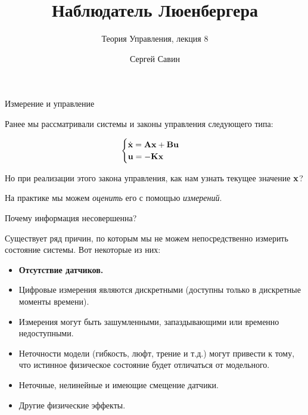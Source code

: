 \documentclass{beamer}
\title{Наблюдатель Люенбергера}
\subtitle{Теория Управления, лекция 8}
\author{Сергей Савин}
\date{\mydate}
\begin{document}
\maketitle






\begin{frame}{Измерение и управление}
	\begin{flushleft}
		
		Ранее мы рассматривали системы и законы управления следующего типа:
		
		\begin{equation}
			\begin{cases}
				\dot {\mathbf{x}} = \mathbf{A} \mathbf{x} + \mathbf{B} \mathbf{u}\\
				\mathbf{u} = -\mathbf{K} \mathbf{x}
			\end{cases}
		\end{equation}
		
		Но при реализации этого закона управления, как нам узнать текущее значение $\mathbf{x}$?
		
		\bigskip
		
		На практике мы можем \emph{оценить} его с помощью \emph{измерений}.
		
	\end{flushleft}
\end{frame}

\begin{frame}{Почему информация несовершенна?}
	\begin{flushleft}
		
		Существует ряд причин, по которым мы не можем непосредственно измерить состояние системы. Вот некоторые из них:
		
		\begin{itemize}
			\item \textbf{Отсутствие датчиков.}
			\item Цифровые измерения являются дискретными (доступны только в дискретные моменты времени).
			\item Измерения могут быть зашумленными, запаздывающими или временно недоступными.
			\item Неточности модели (гибкость, люфт, трение и т.д.) могут привести к тому, что истинное физическое состояние будет отличаться от модельного.
			\item Неточные, нелинейные и имеющие смещение датчики.
			\item Другие физические эффекты.
		\end{itemize}
		
	\end{flushleft}
\end{frame}
\end{document}
